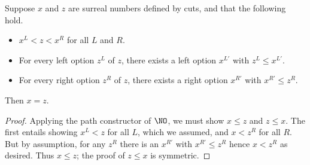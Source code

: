 %
\begin{thm}\label{thm:NO-simplicity}
  Suppose $x$ and $z$ are surreal numbers defined by cuts, and that the following hold.
  \begin{itemize}
  \item $x^L < z < x^R$ for all $L$ and $R$.
  \item For every left option $z^L$ of $z$, there exists a left option $x^{L'}$ with $z^L\le x^{L'}$.
  \item For every right option $z^R$ of $z$, there exists a right option $x^{R'}$ with $x^{R'}\le z^R$.
  \end{itemize}
  Then $x=z$.
\end{thm}

\begin{proof}
  Applying the path constructor of $\NO$, we must show $x\le z$ and $z\le x$.
  The first entails showing $x^L<z$ for all $L$, which we assumed, and $x<z^R$ for all $R$.
  But by assumption, for any $z^R$ there is an $x^{R'}$ with $x^{R'}\le z^R$ hence $x<z^R$ as desired.
  Thus $x\le z$; the proof of $z\le x$ is symmetric.
\end{proof}
